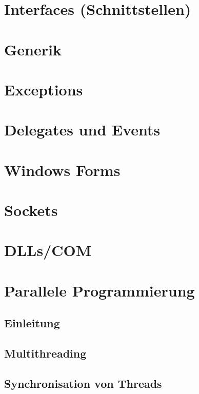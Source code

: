 \documentclass{scrreprt}
\begin{document}
\chapter{Interfaces (Schnittstellen)}


\chapter{Generik}


\chapter{Exceptions}


\chapter{Delegates und Events}


\chapter{Windows Forms}



\chapter{Sockets}


\chapter{DLLs/COM}


\chapter{Parallele Programmierung}
\section{Einleitung}

\section{Multithreading}

\section{Synchronisation von Threads}

\end{document}
